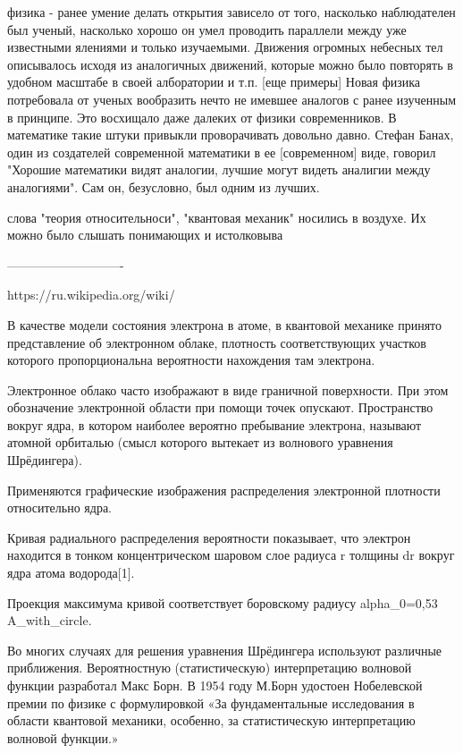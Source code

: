 физика - ранее умение делать открытия зависело от того, насколько наблюдателен был ученый, насколько хорошо он умел проводить параллели между уже известными ялениями и только изучаемыми.
Движения огромных небесных тел описывалось исходя из аналогичных движений, которые можно было повторять в удобном масштабе в своей алборатории и т.п. [еще примеры]
Новая физика потребовала от ученых вообразить нечто не имевшее аналогов с ранее изученным в принципе. 
Это восхищало даже далеких от физики современников.
В математике такие штуки привыкли проворачивать довольно давно. 
Стефан Банах, один из создателей современной математики в ее [современном] виде, говорил "Хорошие математики видят аналогии, лучшие могут видеть аналигии между аналогиями". Сам он, безусловно, был одним из лучших.

 
слова "теория относительноси", "квантовая механик" носились в воздухе. Их можно было слышать  понимающих и истолковыва

----------------------------



https://ru.wikipedia.org/wiki/%
{
В качестве модели состояния электрона в атоме, в квантовой механике принято представление об электронном облаке, плотность соответствующих участков которого пропорциональна вероятности нахождения там электрона.

Электронное облако часто изображают в виде граничной поверхности. При этом обозначение электронной области при помощи точек опускают. Пространство вокруг ядра, в котором наиболее вероятно пребывание электрона, называют атомной орбиталью (смысл которого вытекает из волнового уравнения Шрёдингера).

Применяются графические изображения распределения электронной плотности относительно ядра.

Кривая радиального распределения вероятности показывает, что электрон находится в тонком концентрическом шаровом слое радиуса r толщины dr вокруг ядра атома водорода[1].

Проекция максимума кривой соответствует боровскому радиусу alpha_0=0,53 A_with_circle.

Во многих случаях для решения уравнения Шрёдингера используют различные приближения. Вероятностную (статистическую) интерпретацию волновой функции разработал Макс Борн. В 1954 году М.Борн удостоен Нобелевской премии по физике с формулировкой «За фундаментальные исследования в области квантовой механики, особенно, за статистическую интерпретацию волновой функции.»
}

